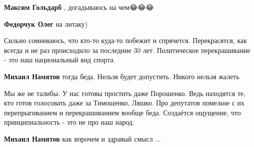 \begin{itemize}
\begin{itemize}
\textbf{Максим Гольдарб} , догадываюсь на чем😂😂😂

 
\textbf{Федорчук Олег} на литаку)
\end{itemize}

 

Сильно сомневаюсь, что кто-то куда-то побежит и спрячется. Перекрасятся, как
всегда и не раз происходило за последние 30 лет. Политическое перекрашивание -
это наш национальный вид спорта.

\begin{itemize}
 
\textbf{Михаил Намятов} тогда беда. Нельзя будет допустить. Никого нельзя жалеть

 

Мы же не талибы. У нас готовы простить даже Порошенко. Ведь находятся те, кто
готов голосовать даже за Тимошенко, Ляшко. Про депутатов помельче с их
перепрыгиванием и перекрашиванием вообще беда. Создаётся ощущение, что
принципиальность - это не про наш народ.


 
\textbf{Михаил Намятов} как впрочем и здравый смысл ...

 

\end{itemize}
\end{itemize}
